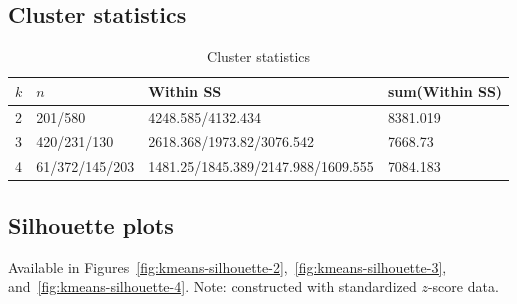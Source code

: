 \documentclass[letterpaper,12pt]{article}
\begin{document}

\subsection{Cluster statistics}
\begin{table}[h]
  \centering
  \begin{tabular}{l|l|l|l}
    $k$ & $n$ & Within SS & sum(Within SS) \\
    \hline
    2 & 201/580 & 4248.585/4132.434 & 8381.019 \\
    3 & 420/231/130 & 2618.368/1973.82/3076.542 &  7668.73 \\
    4 & 61/372/145/203 & 1481.25/1845.389/2147.988/1609.555 & 7084.183
  \end{tabular}
  \caption{Cluster statistics}
  \label{tab:cluster-statistics}
\end{table}

\subsection{Silhouette plots}

Available in
Figures~\ref{fig:kmeans-silhouette-2},~\ref{fig:kmeans-silhouette-3},
and~\ref{fig:kmeans-silhouette-4}. Note: constructed with standardized
$z$-score data.
\end{document}
